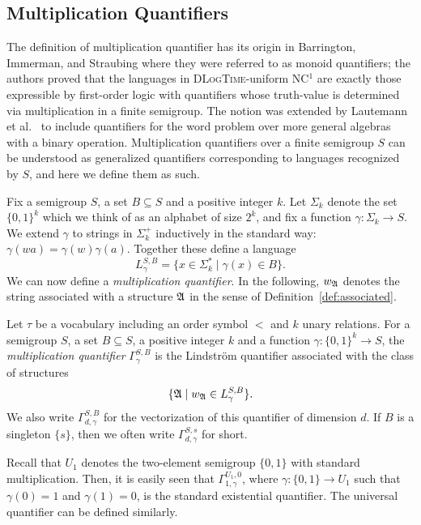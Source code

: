 \documentclass[a4paper,UKenglish,cleveref, autoref, thm-restate, anonymous]{lipics-v2021}
\begin{document}
\subsection{Multiplication Quantifiers}

The definition of multiplication quantifier has its origin in Barrington, Immerman, and Straubing \cite[Section 5]{barrington1990uniformity} where they were referred to as monoid quantifiers; the authors proved that the languages in \textsc{DLogTime}-uniform NC${}^1$ are exactly those expressible by first-order logic with quantifiers whose truth-value is determined via multiplication in a finite semigroup.  The notion was extended by Lautemann et al.~\cite{lautemann2001descriptive} to include quantifiers for the word problem over more general algebras with a binary operation.  Multiplication quantifiers over a finite semigroup $S$ can be understood as generalized quantifiers corresponding to languages recognized by $S$, and here we define them as such.

Fix a semigroup $S$, a set $B \subseteq S$ and a positive integer $k$.  Let $\Sigma_k$ denote the set $\{0,1\}^k$ which we think of as an alphabet of size $2^k$, and fix a function $\gamma: \Sigma_k \rightarrow S$.  We extend $\gamma$ to strings in $\Sigma_k^+$ inductively in the standard way: $\gamma(wa) = \gamma(w)\gamma(a)$.  Together these define a language
$$L^{S,B}_{\gamma} = \{ x \in \Sigma_k^* \mid \gamma(x) \in B\}.$$
We can now define a \emph{multiplication quantifier}.  In the following, $w_{\mathfrak{A}}$ denotes the string associated with a structure $\mathfrak{A}$ in the sense of Definition~\ref{def:associated}.
\begin{definition}\label{def:multquant}
Let $\tau$ be a vocabulary including an order symbol $<$ and $k$ unary relations.
For a semigroup $S$, a set $B \subseteq S$, a positive integer $k$ and a function $\gamma: \{0,1\}^k \rightarrow S$, the \emph{multiplication quantifier} $\Gamma_{\gamma}^{S,B}$ is the Lindstr\"om quantifier associated with the class of structures
$$\{ \mathfrak{A} \mid w_{\mathfrak{A}} \in L^{S,B}_{\gamma}\}.$$
We also write $\Gamma_{d,\gamma}^{S,B}$ for the vectorization of this quantifier of dimension $d$. If $B$ is a singleton $\{s\}$, then we often write $\Gamma^{S,s}_{d,\gamma}$ for short.
\end{definition}

Recall that $U_1$ denotes the two-element semigroup $\{0,1\}$ with standard multiplication.  Then, it is easily seen that $\Gamma^{U_1,0}_{1,\gamma}$,  where $\gamma : \{0,1\} \rightarrow U_1$ such that $\gamma(0) = 1$ and $\gamma(1) = 0$, is the standard existential quantifier.  The universal quantifier can be defined similarly.
\end{document}

